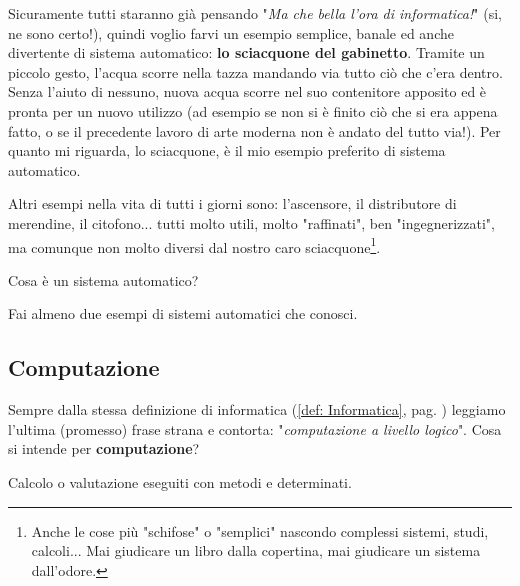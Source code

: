 \documentclass[11pt,fleqn,a5paper]{book} %
\begin{document}
    			Sicuramente tutti staranno già pensando "\textit{Ma che bella l'ora di informatica!}" (si, ne sono certo!), quindi voglio farvi un esempio semplice, banale ed anche divertente di sistema automatico: \textbf{lo sciacquone del gabinetto}. Tramite un piccolo gesto, l'acqua scorre nella tazza mandando via tutto ciò che c'era dentro. Senza l'aiuto di nessuno, nuova acqua scorre nel suo contenitore apposito ed è pronta per un nuovo utilizzo (ad esempio se non si è finito ciò che si era appena fatto, o se il precedente lavoro di arte moderna non è andato del tutto via!).
    			Per quanto mi riguarda, lo sciacquone, è il mio esempio preferito di sistema automatico.
    			
    			Altri esempi nella vita di tutti i giorni sono: l'ascensore, il distributore di merendine, il citofono... tutti molto utili, molto "raffinati", ben "ingegnerizzati", ma comunque non molto diversi dal nostro caro sciacquone\footnote{Anche le cose più "schifose" o "semplici" nascondo complessi sistemi, studi, calcoli... Mai giudicare un libro dalla copertina, mai giudicare un sistema dall'odore.}.
    			\begin{exercise}
    				Cosa è un sistema automatico?
    			\end{exercise}
    			\begin{exercise}
    				Fai almeno due esempi di sistemi automatici che conosci.
    			\end{exercise}
    			
    		\subsection{Computazione}
    		\label{sub: Computazione}
    			Sempre dalla stessa definizione di informatica (\ref{def: Informatica}, pag. \pageref{def: Informatica}) leggiamo l'ultima (promesso) frase strana e contorta: "\textit{computazione a livello logico}". Cosa si intende per \textbf{computazione}?
    			\begin{definition}[Computazione]\label{def: Computazione}
    				Calcolo o valutazione eseguiti con metodi e determinati.
    			\end{definition}
    		
\end{document}
